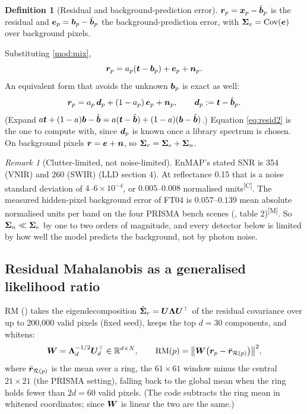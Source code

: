 \documentclass[11pt,a4paper]{article}
\theoremstyle{plain}
\theoremstyle{definition}
\newtheorem{definition}[proposition]{Definition}
\theoremstyle{remark}
\newtheorem{remark}[proposition]{Remark}
\newcommand{\R}{\mathbb{R}}
\newcommand{\Cov}{\operatorname{Cov}}
\newcommand{\x}{\B{x}}
\newcommand{\bvec}{\B{b}}
\newcommand{\bh}{\hat{\B{b}}}
\newcommand{\tv}{\B{t}}
\newcommand{\rv}{\B{r}}
\newcommand{\ev}{\B{e}}
\newcommand{\nv}{\B{n}}
\newcommand{\dv}{\B{d}}
\newcommand{\Wm}{\B{W}}
\newcommand{\Um}{\B{U}}
\newcommand{\meas}{\textsuperscript{\textsf{\scriptsize[M]}}}
\newcommand{\comp}{\textsuperscript{\textsf{\scriptsize[C]}}}
\begin{document}
\begin{definition}[Residual and background-prediction error]
$\rv_p=\x_p-\bh_p$ is the residual and $\ev_p=\bvec_p-\bh_p$ the background-prediction error, with
$\B\Sigma_e=\Cov(\ev)$ over background pixels.
\end{definition}

Substituting \cref{mod:mix},
\begin{equation}
  \rv_p = a_p(\tv-\bvec_p) + \ev_p + \nv_p .
  \label{eq:resid}
\end{equation}
An equivalent form that avoids the unknown $\bvec_p$ is exact as well:
\begin{equation}
  \rv_p = a_p\,\dv_p + (1-a_p)\,\ev_p + \nv_p,\qquad \dv_p:=\tv-\bh_p .
  \label{eq:resid2}
\end{equation}
(Expand $a\tv+(1-a)\bvec-\bh = a(\tv-\bh)+(1-a)(\bvec-\bh)$.) Equation \eqref{eq:resid2} is the one to compute
with, since $\dv_p$ is known once a library spectrum is chosen. On background pixels $\rv=\ev+\nv$, so
$\bm{\Sigma}_r=\bm{\Sigma}_e+\bm{\Sigma}_n$.

\begin{remark}[Clutter-limited, not noise-limited]
\label{rem:noise}
EnMAP's stated SNR is 354 (VNIR) and 260 (SWIR) (LLD section 4). At reflectance 0.15 that is a noise standard
deviation of $4$--$6\times10^{-4}$, or $0.005$--$0.008$ normalised units\comp. The measured hidden-pixel
background error of FT04 is $0.057$--$0.139$ mean absolute normalised units per band on the four PRISMA bench
scenes (, table 2)\meas. So $\bm{\Sigma}_n\ll\bm{\Sigma}_e$ by one to two
orders of magnitude, and every detector below is limited by how well the model predicts the background,
not by photon noise.
\end{remark}

\subsection{Residual Mahalanobis as a generalised likelihood ratio}

RM () takes the eigendecomposition $\hat{\B\Sigma}_r=\Um\B\Lambda\Um^\top$ of the
residual covariance over up to 200{,}000 valid pixels (fixed seed), keeps the top $d=30$ components, and whitens:
\[
  \Wm=\B\Lambda_d^{-1/2}\Um_d^\top\in\R^{d\times N},\qquad
  \mathrm{RM}(p)=\big\lVert \Wm\big(\rv_p-\bar{\rv}_{\mathcal R(p)}\big)\big\rVert^2 ,
\]
where $\bar{\rv}_{\mathcal R(p)}$ is the mean over a ring, the $61\times61$ window minus the central $21\times21$
(the PRISMA setting), falling back to the global mean when the ring holds fewer than $2d=60$ valid pixels.
(The code subtracts the ring mean in whitened coordinates; since $\Wm$ is linear the two are the same.)
\end{document}
